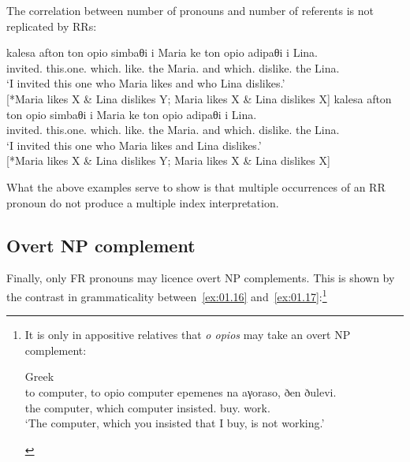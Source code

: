 \documentclass[output=paper]{langsci/langscibook}
\begin{document}
The correlation between number of pronouns and number of referents is not
replicated by \glspl{RR}:\largerpage

\ea {}\label{ex:01.15}
	\ea
		\gll kalesa afton {ton opio} simbaθi i Maria ke {ton opio} adipaθi i Lina.\\
			invited.\Fsg{} this.one.\Acc{} which.\Acc{} like.\Tsg{} the Maria.\Nom{} and  which.\Acc{} dislike.\Tsg{} the Lina.\Nom{}\\
		\glt \enquote*{I invited this one who Maria likes and who Lina dislikes.}\\
        {}[*Maria likes X \& Lina dislikes Y;  Maria likes X \& Lina dislikes X]
	\ex
		\gll kalesa afton {ton opio} simbaθi i Maria ke {ton opio} adipaθi i Lina.\\
			invited.\Fsg{} this.one.\Acc{} which.\Acc{} like.\Tsg{} the Maria.\Nom{} and  which.\Acc{} dislike.\Tsg{} the Lina.\Nom{}\\
		\glt \enquote*{I invited this one who Maria likes and Lina dislikes.}\\
        {}[*Maria likes X \& Lina dislikes Y;  Maria likes X \& Lina dislikes X]
	\z
\z

What the above examples serve to show is that multiple occurrences of an
\gls{RR} pronoun do not produce a multiple index interpretation.

\subsection{Overt NP complement}
Finally, only \gls{FR} pronouns may
licence overt NP complements. This is shown by the contrast in grammaticality
between~\eqref{ex:01.16} and~\eqref{ex:01.17}:\footnote{It is only in
    appositive relatives that \emph{o opios} may take an overt NP complement:

\begin{exe}
     Greek\\
	\gll to computer, {to opio} computer epemenes na aγoraso, ðen ðulevi.\\
		the computer, which computer insisted.\Ssg{} \Sbjv{} buy.\Fsg{} \Neg{} work.\Tsg{}\\
	\glt \enquote*{The computer, which you insisted that I buy, is not working.}
\end{exe}}
\end{document}
